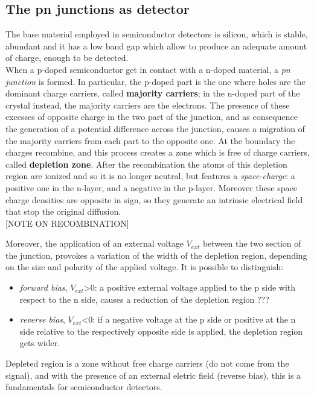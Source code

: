 \subsection{The pn junctions as detector}

The base material employed in semiconductor detectors is silicon, which is stable, abundant and it has a low band gap which allow to produce an adequate amount of charge, enough to be detected.\\ 
When a p-doped semiconductor get in contact with a n-doped material, a \textit{pn junction} is formed. In particular, the p-doped part is the one where holes are the dominant charge carriers, called \textbf{majority carriers}; in the n-doped part of the crystal instead, the majority carriers are the electrons. 
The presence of these excesses of opposite charge in the two part of the junction, and as consequence the generation of a potential difference across the junction, causes a migration of the majority carriers from each part to the opposite one. At the boundary the charges recombine, and this process creates a zone which is free of charge carriers, called \textbf{depletion zone}. After the recombination the atoms of this depletion region are ionized and so it is no longer neutral, but features a \emph{space-charge}: a positive one in the n-layer, and a negative in the p-layer. Moreover these space charge densities are opposite in sign, so they generate an intrinsic electrical field that stop the original diffusion.\\

[NOTE ON RECOMBINATION]

Moreover, the application of an external voltage $V_{ext}$ between the two section of the junction, provokes a variation of the width of the depletion region, depending on the size and polarity of the applied voltage. It is possible to distinguish:

\begin{itemize}
\item \emph{forward bias}, $V_{ext}$>0: a positive external voltage applied to the p side with respect to the n side, causes a reduction of the depletion region ???
\item \emph{reverse bias}, $V_{ext}$<0: if a negative voltage at the p side or positive at the n side relative to the respectively opposite side is applied, the depletion region gets wider.
\end{itemize}

Depleted region is a zone without free charge carriers (do not come from the signal), and with the presence of an external eletric field (reverse bias), this is a fundamentals for semiconductor detectors.

